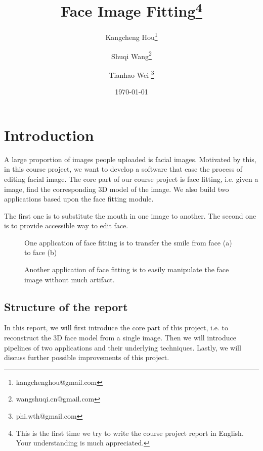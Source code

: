 \documentclass{article}
\title{Face Image Fitting\footnote{This is the first time we try to write the course project report in English. Your understanding is much appreciated.}}
\author{Kangcheng Hou\footnote{kangchenghou@gmail.com} \and Shuqi Wang\footnote{wangshuqi.cn@gmail.com} \and Tianhao Wei \footnote{phi.wth@gmail.com}}
\date{\today}
\begin{document}
\maketitle
\tableofcontents

\section{Introduction}
A large proportion of images people uploaded is facial images. Motivated by this, in this course project, we want to develop a software that ease the process of editing facial image. The core part of our course project is face fitting, i.e. given a image, find the corresponding 3D model of the image. We also build two applications based upon the face fitting module.

The first one is to substitute the mouth in one image to another. The second one is to provide accessible way to edit face.
\begin{figure}
    \centering
    \hfill
    \caption{One application of face fitting is to transfer the smile from face (a) to face (b)}
\end{figure}
\begin{figure}
    \centering
    \hfill
    \caption{Another application of face fitting is to easily manipulate the face image without much artifact.}
\end{figure}

\subsection{Structure of the report}
In this report, we will first introduce the core part of this project, i.e. to reconstruct the 3D face model from a single image. Then we will introduce pipelines of two applications and their underlying techniques. Lastly, we will discuss further possible improvements of this project.
     


 



  
\end{document}
